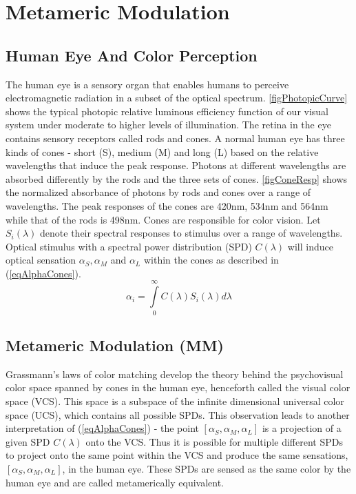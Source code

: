 \section{Metameric Modulation}
\label{sec:metameric}
\graphicspath{{_MIMOColor/figures_mm/}}

\subsection{Human Eye And Color Perception}
\label{subsec:metamericEye}
The human eye is a sensory organ that enables humans to perceive electromagnetic radiation in a subset of the optical spectrum. \figurename{ \ref{figPhotopicCurve}} \cite{jai89a} shows the typical photopic relative luminous efficiency function of our visual system under moderate to higher levels of illumination. The retina in the eye contains sensory receptors called rods and cones. A normal human eye has three kinds of cones - short (S), medium (M) and long (L) based on the relative wavelengths that induce the peak response. Photons at different wavelengths are absorbed differently by the rods and the three sets of cones. \figurename{ \ref{figConeResp}} \cite{wan96a} shows the normalized absorbance of photons by rods and cones over a range of wavelengths. The peak responses of the cones are 420nm, 534nm and 564nm while that of the rods is 498nm. Cones are responsible for color vision. Let $S_{i}(\lambda)$ denote their spectral responses to stimulus over a range of wavelengths. Optical stimulus with a spectral power distribution (SPD) $C(\lambda)$ will induce optical sensation ${\alpha}_{S}, {\alpha}_{M}$ and ${\alpha}_{L}$ within the cones as described in (\ref{eqAlphaCones}).
\begin{equation}
	\label{eqAlphaCones}
	\alpha_{i} = \int\limits_{0}^{\infty} C(\lambda)S_{i}(\lambda)d\lambda
\end{equation}

\subsection{Metameric Modulation (MM)}
\label{subsec:metamericMM}
Grassmann's laws \cite{gra54a} of color matching develop the theory behind the psychovisual color space spanned by cones in the human eye, henceforth called the visual color space (VCS).  This space is a subspace  of the infinite dimensional universal color space (UCS), which contains all possible SPDs. This observation leads to another interpretation of (\ref{eqAlphaCones}) - the point $[{\alpha}_{S},{\alpha}_{M},{\alpha}_{L}]$ is a projection of a given SPD $C(\lambda)$ onto the VCS. Thus it is possible for multiple different SPDs to project onto the same point within the VCS and produce the same sensations, $[{\alpha}_{S},{\alpha}_{M},{\alpha}_{L}]$, in the human eye. These SPDs are sensed as the same color by the human eye and are called metamerically equivalent.

